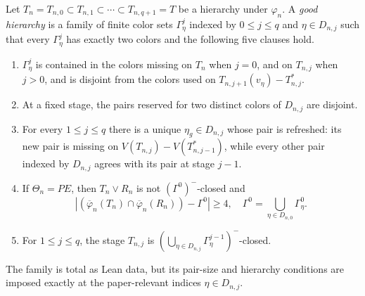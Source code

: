 \begin{definition}
Let
$T_n=T_{n,0}\subset T_{n,1}\subset\cdots\subset T_{n,q+1}=T$
be a hierarchy under $\varphi_n$.  A \emph{good hierarchy} is a family
of finite color sets $\Gamma^j_\eta$ indexed by
$0\leq j\leq q$ and $\eta\in D_{n,j}$ such that every
$\Gamma^j_\eta$ has exactly two colors and the following five clauses
hold.
\begin{enumerate}
\item $\Gamma^j_\eta$ is contained in the colors missing on $T_n$ when
$j=0$, and on $T_{n,j}$ when $j>0$, and is disjoint from the colors used
on $T_{n,j+1}(v_\eta)-T_{n,j}^{*}$.
\item At a fixed stage, the pairs reserved for two distinct colors of
$D_{n,j}$ are disjoint.
\item For every $1\leq j\leq q$ there is a unique
$\eta_g\in D_{n,j}$ whose pair is refreshed: its new pair is missing on
$V(T_{n,j})-V(T_{n,j-1}^{*})$, while every other pair indexed by
$D_{n,j}$ agrees with its pair at stage $j-1$.
\item If $\Theta_n=PE$, then $T_n\vee R_n$ is not
$(\Gamma^0)^{-}$-closed and
\[
 |(\overline\varphi_n(T_n)\cap\overline\varphi_n(R_n))-\Gamma^0|
 \geq4,
 \quad
 \Gamma^0=\bigcup_{\eta\in D_{n,0}}\Gamma^0_\eta.
\]
\item For $1\leq j\leq q$, the stage $T_{n,j}$ is
$(\bigcup_{\eta\in D_{n,j}}\Gamma^{j-1}_\eta)^{-}$-closed.
\end{enumerate}
The family is total as Lean data, but its pair-size and hierarchy
conditions are imposed exactly at the paper-relevant indices
$\eta\in D_{n,j}$.
\end{definition}
